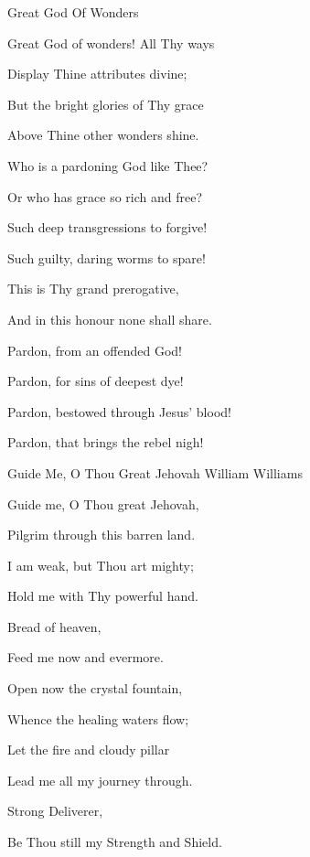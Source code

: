 \documentclass[12pt]{book}
\begin{document}
\begin{song}{Great God Of Wonders}{}
  {\SBPubDom}
  {}
  {}
  {}

  \begin{SBVerse}
    Great God of wonders! All Thy ways

    Display Thine attributes divine;

    But the bright glories of Thy grace

    Above Thine other wonders shine.
  \end{SBVerse}

  \begin{SBOpGroup}
    Who is a pardoning God like Thee?

    Or who has grace so rich and free?
  \end{SBOpGroup}

  \begin{SBVerse}
    Such deep transgressions to forgive!

    Such guilty, daring worms to spare!

    This is Thy grand prerogative,

    And in this honour none shall share.
  \end{SBVerse}

  \begin{SBVerse}
    Pardon, from an offended God!

    Pardon, for sins of deepest dye!

    Pardon, bestowed through Jesus' blood!

    Pardon, that brings the rebel nigh!
  \end{SBVerse}

\end{song}

\begin{song}{Guide Me, O Thou Great Jehovah}{}
  {\SBPubDom}
  {William Williams}
  {}
  {}

  \begin{SBVerse}
    Guide me, O Thou great Jehovah,

    Pilgrim through this barren land.

    I am weak, but Thou art mighty;

    Hold me with Thy powerful hand.

    Bread of heaven,

    Feed me now and evermore.
  \end{SBVerse}

  \begin{SBVerse}
    Open now the crystal fountain,

    Whence the healing waters flow;

    Let the fire and cloudy pillar

    Lead me all my journey through.

    Strong Deliverer,

    Be Thou still my Strength and Shield.
  \end{SBVerse}

\end{song}
\end{document}
